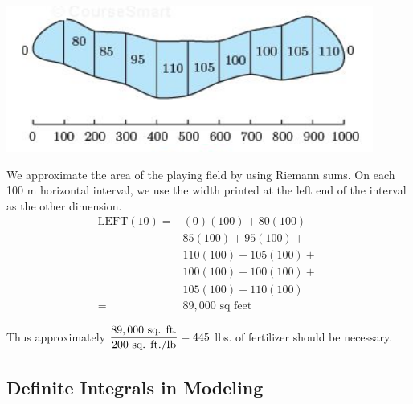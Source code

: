 \begin{enumerate}[1.]
\begin{multicols}{2}
\begin{Question}
\includegraphics[width=0.9\linewidth]{graphics/Week04_TheDefiniteIntegral/GolfHole}
  \end{Question}

  \begin{Solution}
    We approximate the area of the playing field by using Riemann
    sums. On each 100 m horizontal interval, we use the width printed at the left end of the
interval as the other dimension.
\begin{align*}
 \mbox{LEFT}(10) = & (0)(100) + 80(100) +  \\
&85(100) +95(100) + \\
&110(100) + 105(100) + \\
&100(100) + 100(100) + \\
&105(100) + 110(100) \\
= & 89,000 \mbox{ sq feet} 
\end{align*}

    Thus approximately
    $\displaystyle \frac{89,000 \mbox{ sq. ft.}}{200 \mbox{ sq. ft./lb}} = 445$
    lbs. of fertilizer should be necessary.

  \end{Solution}

\end{multicols}

\hrulefill

\subsection*{Definite Integrals in Modeling}


\end{enumerate}
